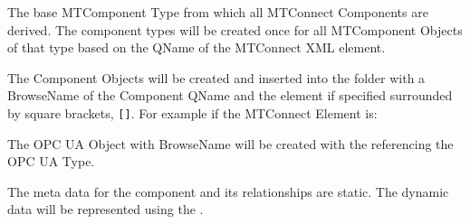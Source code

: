\FloatBarrier


The base \gls{MTComponent} Type from which all MTConnect Components are derived.
The component types will be created once for all \gls{MTComponent} \glspl{Object}
of that type based on the \gls{QName} of the MTConnect XML element. 

The Component Objects will be created and inserted into the  
folder with a \gls{BrowseName} of the Component \gls{QName} and the  element if specified surrounded 
by square brackets, \texttt{[]}. For example if the MTConnect Element is:


The OPC UA Object with \gls{BrowseName}  will be created with the 
referencing the  OPC UA \gls{Type}. 

The meta data for the component and its relationships are static. The dynamic data will be 
represented using the \cite{UAPart8}.



